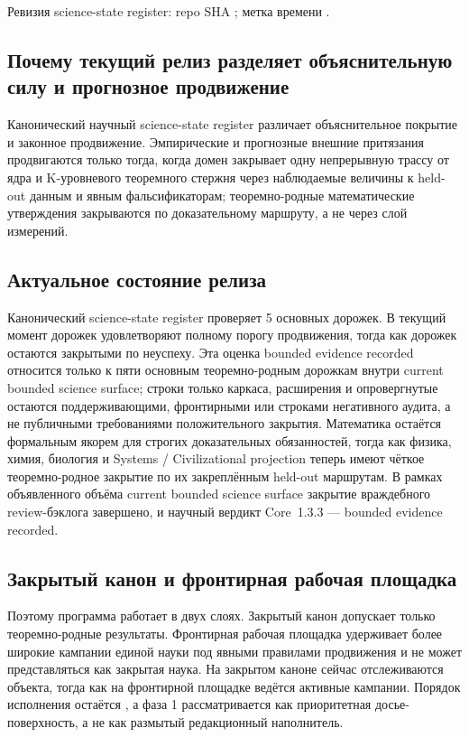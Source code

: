 Ревизия science-state register: repo SHA ; метка времени .

\subsection{Почему текущий релиз разделяет объяснительную силу и прогнозное продвижение}
Канонический научный science-state register различает объяснительное покрытие и законное продвижение. Эмпирические и прогнозные внешние притязания продвигаются только тогда, когда домен закрывает одну непрерывную трассу от ядра и K-уровневого теоремного стержня через наблюдаемые величины к held-out данным и явным фальсификаторам; теоремно-родные математические утверждения закрываются по доказательному маршруту, а не через слой измерений.

\subsection{Актуальное состояние релиза}
Канонический science-state register проверяет 5 основных дорожек. В текущий момент  дорожек удовлетворяют полному порогу продвижения, тогда как  дорожек остаются закрытыми по неуспеху.
Эта оценка bounded evidence recorded относится только к пяти основным теоремно-родным дорожкам внутри current bounded science surface; строки только каркаса, расширения и опровергнутые остаются поддерживающими, фронтирными или строками негативного аудита, а не публичными требованиями положительного закрытия.
Математика остаётся формальным якорем для строгих доказательных обязанностей, тогда как физика, химия, биология и Systems / Civilizational projection теперь имеют чёткое теоремно-родное закрытие по их закреплённым held-out маршрутам. В рамках объявленного объёма current bounded science surface закрытие враждебного review-бэклога завершено, и научный вердикт Core~1.3.3 — bounded evidence recorded.

\subsection{Закрытый канон и фронтирная рабочая площадка}
Поэтому программа работает в двух слоях. Закрытый канон допускает только теоремно-родные результаты. Фронтирная рабочая площадка удерживает более широкие кампании единой науки под явными правилами продвижения и не может представляться как закрытая наука.
На закрытом каноне сейчас отслеживаются  объекта, тогда как на фронтирной площадке ведётся  активные кампании.
Порядок исполнения остаётся , а фаза 1 рассматривается как приоритетная досье-поверхность, а не как размытый редакционный наполнитель.

